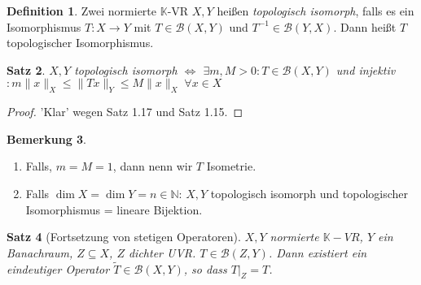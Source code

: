 \documentclass[ngerman]{report}
\theoremstyle{plain}%
\newtheorem{thm}{Satz}[chapter]
\theoremstyle{definition}%
\newtheorem{definition}[thm]{Definition}
\theoremstyle{myStyle}
\newtheorem{bem}[thm]{Bemerkung}
\newcommand{\N}{\mathbb{N}}
\newcommand{\K}{\mathbb{K}}
\newcommand{\B}{\mathcal{B}} %
\newcommand{\BS}[1][X,Y]{\mathcal{B}(#1)} %
\newcommand{\norm}[1]{\|#1\|}
\newcommand{\aq}{\Leftrightarrow} %
\newcommand{\inv}[1]{#1^{-1}}
\newcommand{\qmarks}[1]{#1}
\begin{document}
	\begin{definition}
		Zwei normierte $\K$-VR $X,Y$ heißen \textit{topologisch isomorph}, falls es ein Isomorphismus 
		$T: X\to Y$ mit $T\in \BS$ und $\inv{T}\in\B(Y,X)$. Dann heißt $T$ topologischer Isomorphismus.
	\end{definition}

	\begin{thm}
		$X, Y$ topologisch isomorph $\aq$ $\exists m,M > 0: T\in \BS$ und injektiv
		$: m\norm{x}_X \leq \norm{Tx}_Y \leq M \norm{x}_X \; \forall x\in X$
	\end{thm}
	\begin{proof}
		'Klar' wegen Satz 1.17 und Satz 1.15.
	\end{proof}
	
	\begin{bem}
		\begin{enumerate}
			\item Falls, $m=M=1$, dann nenn wir $T$ \qmarks{Isometrie}.
			\item Falls $\dim X = \dim Y = n\in \N$: $X,Y$ topologisch isomorph und topologischer Isomorphismus = lineare Bijektion.
		\end{enumerate}
	\end{bem}
	\begin{thm}[Fortsetzung von stetigen Operatoren]
		$X,Y$ normierte $\K-VR$, $Y$ ein Banachraum, $Z\subseteq X$, $Z$ dichter UVR.
		$T\in \B(Z,Y)$. Dann existiert ein eindeutiger Operator $\tilde{T} \in \BS$, so dass
		$T|_Z = T$.
	\end{thm}
\end{document}
